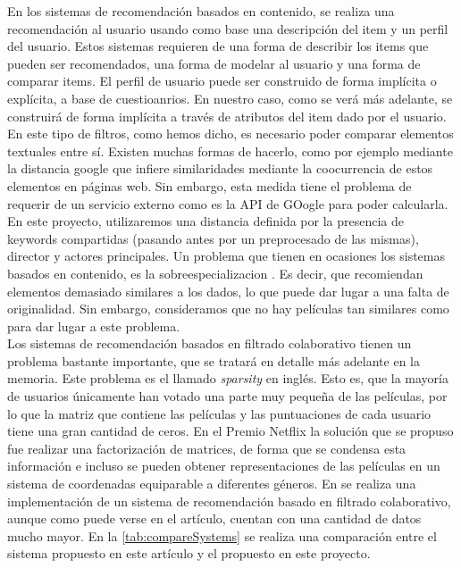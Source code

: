 En los sistemas de recomendación basados en contenido, se realiza una recomendación al usuario usando como base una descripción del item y un perfil del usuario. Estos sistemas requieren de una forma de describir los items que pueden ser recomendados, una forma de modelar al usuario y una forma de comparar items. El perfil de usuario puede ser construido de forma implícita o explícita, a base de cuestioanrios. En nuestro caso, como se verá más adelante, se construirá de forma implícita a través de atributos del item dado por el usuario. En este tipo de filtros, como hemos dicho, es necesario poder comparar elementos textuales entre sí. Existen muchas formas de hacerlo, como por ejemplo mediante la distancia google \cite{cilibrasi} que infiere similaridades mediante la coocurrencia de estos elementos en páginas web. Sin embargo, esta medida tiene el problema de requerir de un servicio externo como es la API de GOogle para poder calcularla. En este proyecto, utilizaremos una distancia definida por la presencia de keywords compartidas (pasando antes por un preprocesado de las mismas), director y actores principales. Un problema que tienen en ocasiones los sistemas basados en contenido, es la sobreespecializacion \cite{zhang}. Es decir, que recomiendan elementos demasiado similares a los dados, lo que puede dar lugar a una falta de originalidad. Sin embargo, consideramos que no hay películas tan similares como para dar lugar a este problema.\\

Los sistemas de recomendación basados en filtrado colaborativo tienen un problema bastante importante, que se tratará en detalle más adelante en la memoria. Este problema es el llamado \textit{sparsity} en inglés. Esto es, que la mayoría de usuarios únicamente han votado una parte muy pequeña de las películas, por lo que la matriz que contiene las películas y las puntuaciones de cada usuario tiene una gran cantidad de ceros. En el Premio Netflix \cite{netflix} la solución que se propuso fue realizar una factorización de matrices, de forma que se condensa esta información e incluso se pueden obtener representaciones de las películas en un sistema de coordenadas equiparable a diferentes géneros. En \cite{ilhami2014film} se realiza una implementación de un sistema de recomendación basado en filtrado colaborativo, aunque como puede verse en el artículo, cuentan con una cantidad de datos mucho mayor. En la \autoref{tab:compareSystems} se realiza una comparación entre el sistema propuesto en este artículo y el propuesto en este proyecto.

